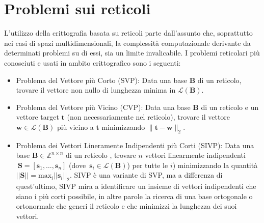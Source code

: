 \section{Problemi sui reticoli}
\label{sec:problemi}
L’utilizzo della crittografia basata su reticoli parte dall'assunto che, soprattutto nei 
casi di spazi multidimensionali, la complessità computazionale derivante da determinati 
problemi su di essi, sia un limite invalicabile. I problemi reticolari 
più conosciuti e usati in ambito crittografico sono i seguenti:
\begin{itemize}
    \item Problema del Vettore più Corto (SVP): Data una base $\mathbf{B}$ di un reticolo, 
    trovare il vettore non nullo di lunghezza minima in $\mathcal{L}(\mathbf{B})$.
    \item Problema del Vettore più Vicino (CVP): Data una base $\mathbf{B}$ di un reticolo e un 
    vettore target $\mathbf{t}$ (non necessariamente nel reticolo), trovare il vettore 
    $\mathbf{w} \in \mathcal{L}(\mathbf{B})$ più vicino a $\mathbf{t}$ minimizzando 
    $\|\mathbf{t}-\mathbf{w}\|_2$.
    \item Problema dei Vettori Lineramente Indipendenti più Corti (SIVP): 
    Data una base $\mathbf{B} \in \mathbb{Z}^{n\times n}$ di un reticolo , 
    trovare $n$ vettori linearmente indipendenti 
    $\ {\mathbf{S} = [\mathbf{s}_1, \dots, \mathbf{s}_n]}$ 
    \mbox{(dove  $\mathbf{s}_i \in \mathcal{L}(\mathbf{B})$)}
    per tutte le $i$) minimizzando la quantità 
    ${||\mathbf{S}|| = \text{max}_i||\mathbf{s}_i||_2}$. 
    SIVP è una variante di SVP, ma a differenza di quest'ultimo, SIVP mira a identificare 
    un insieme di vettori indipendenti che siano i più corti possibile, in altre parole 
    la ricerca di una base ortogonale o ortonormale che generi il reticolo e che minimizzi
     la lunghezza dei suoi vettori.
    \end{itemize}

